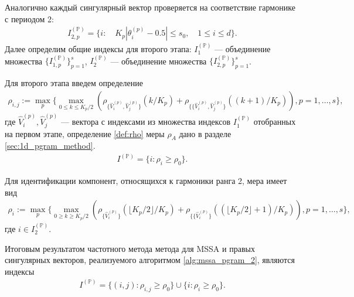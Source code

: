 \documentclass[specialist,
               substylefile = spbu.rtx,
               subf,href,colorlinks=true, 12pt]{disser}
\begin{document}
Аналогично каждый сингулярный вектор проверяется на соответствие гармонике с периодом 2:
\begin{gather} \label{eq:I_2_P_mssa}
I_{2,p}^{(\mathbb{P})} = \{i: \quad  {K_p} |\theta_{i}^{(p)} - 0.5 | \leqslant s_0, \quad 1 \leqslant i \leqslant d  \}.
\end{gather}
Далее определим общие индексы для второго этапа: $I_1^{(\mathbb{P})}$ --- объединение множества $\{ I_{1,p}^{(\mathbb{P})} \}_{p=1}^{s}$, $I_2^{(\mathbb{P})}$ --- объединение множества $\{ I_{2,p}^{(\mathbb{P})} \}_{p=1}^{s}$.

Для второго этапа введем определение
\begin{gather*}
\rho_{i,j} :=  \max_p \{ \max_{0 \leqslant k \leqslant {K_p}/2}{\left(\rho_{\{\widehat{V}_i^{(p)}, \widehat{V}_{j}^{(p)}\}}(k/{K_p}) + \rho_{\{\{\widehat{V}_i^{(p)}, \widehat{V}_{j}^{(p)}\}}((k+1)/{K_p})\right)}, p=1,\ldots, s
 \},
\end{gather*}
где $\widehat{V}_i^{(p)}, \widehat{V}_{j}^{(p)}$ --- вектора с индексами из множества индексов $I_1^{(\mathbb{P})}$ отобранных на первом этапе,
определение \ref{def:rho} меры $\rho_A$ дано в разделе \ref{sec:1d_pgram_method}.
\begin{gather} \label{eq:pgram_I_p_mssa}
I^{(\mathbb{P})} = \{ i: \rho_{i} \geqslant\rho_0 \}.
\end{gather}

Для идентификации компонент, относящихся к гармоники ранга 2, мера имеет вид
\begin{gather*}
\rho_{i} :=  \max_p \{ \max_{0 \geqslant k \geqslant {K_p}/2}{\left(\rho_{\{\widehat{V}_i^{(p)}\}}(\lfloor {K_p}/2 \rfloor/{K_p}) + \rho_{\{\{\widehat{V}_i^{(p)}\}}((\lfloor {K_p}/2 \rfloor + 1)/{K_p})\right)}, p=1,\ldots, s
 \},
\end{gather*}
где $i \in I_2^{(\mathbb{P})}$.

Итоговым результатом частотного метода метода для MSSA и правых сингулярных векторов, реализуемого алгоритмом \ref{alg:mssa_pgram_2}, являются индексы 
\begin{gather} \label{eq:pgram_I_p_mssa}
I^{(\mathbb{P})} = \{ (i,j): \rho_{i,j} \geqslant\rho_0 \} \cup \{ i: \rho_{i} \geqslant\rho_0 \}.
\end{gather}

\end{document}
